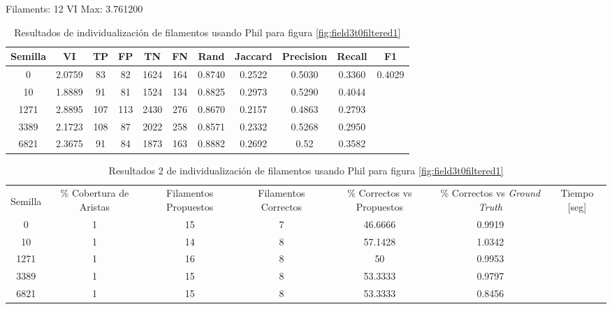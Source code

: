 Filaments: 12	VI Max: 3.761200
\begin{table}[h]
    \centering
    \begin{tabular}{|c|c|c|c|c|c|c|c|c|c|c|}
    \hline
        Semilla & VI & TP & FP &TN &FN & Rand	& Jaccard &	Precision &	Recall &	F1 \\ \hline 
        0    & 2.0759 & 83  & 82  & 1624 & 164 & 0.8740  & 0.2522  & 0.5030  & 0.3360 & 0.4029 \\
        10   & 1.8889  & 91  & 81  & 1524 & 134 & 0.8825 & 0.2973 & 0.5290  & 0.4044 \\
        1271 & 2.8895 & 107 & 113 & 2430 & 276 & 0.8670 & 0.2157 & 0.4863 & 0.2793 \\
        3389 & 2.1723 & 108 & 87  & 2022 & 258 & 0.8571 & 0.2332 & 0.5268 & 0.2950 \\
        6821 & 2.3675 & 91  & 84  & 1873 & 163 & 0.8882 & 0.2692 & 0.52     & 0.3582 \\
        \hline
    \end{tabular}
    \caption{Resultados de individualizaci\'on de filamentos usando Phil para figura \ref{fig:field3t0filtered1}}
    \label{tab:field3t0filteredResults1}
\end{table}

\begin{table}[h]
    \centering
    \begin{tabular}{|c|c|c|c|c|c|c|}
    \hline
         & \multirow{4}{2cm}{\centering \% Cobertura de Aristas} & \multirow{4}{2cm}{Filamentos Propuestos} & \multirow{4}{2cm}{Filamentos Correctos} & \multirow{4}{2.5cm}{\% Correctos vs Propuestos} & \multirow{4}{2.5cm}{\centering \% Correctos vs {\it Ground Truth}} & \multirow{4}{1.2cm}{\centering Tiempo [seg]} \\
         &  &  &  & & &  \\
        Semilla &  &  &  & & &  \\
        &  &  &  & & &  \\ \hline 
        0 & 1 & 15 & 7 & 46.6666 & 0.9919  \\
        10 & 1 & 14 & 8 & 57.1428 & 1.0342\\
        1271 & 1 & 16 & 8 & 50  & 0.9953\\
        3389 & 1 & 15 & 8 & 53.3333 & 0.9797\\
        6821 & 1 & 15 & 8 & 53.3333 & 0.8456\\
        \hline
    \end{tabular}
    \caption{Resultados 2 de individualizaci\'on de filamentos usando Phil para figura \ref{fig:field3t0filtered1}}
    \label{tab:field3t0filtered1Results2}
\end{table}

